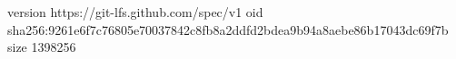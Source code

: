 version https://git-lfs.github.com/spec/v1
oid sha256:9261e6f7c76805e70037842c8fb8a2ddfd2bdea9b94a8aebe86b17043dc69f7b
size 1398256
